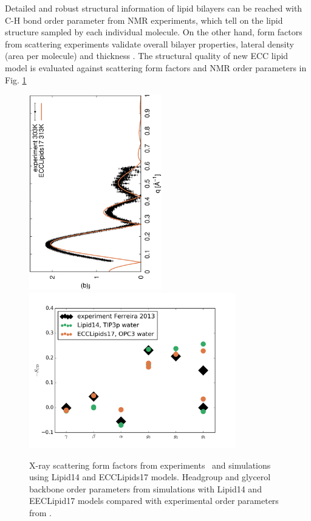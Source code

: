 \documentclass[aip,jcp,twocolumn]{revtex4}
\begin{document}
Detailed and robust structural information of lipid bilayers can
be reached with C-H bond order parameter from NMR experiments,
which tell on the lipid structure sampled by each individual molecule.
On the other hand, form factors from scattering experiments validate overall bilayer properties, 
lateral density (area per molecule) and thickness \cite{ollila16}. 
The structural quality of
new ECC lipid model is evaluated against scattering form factors and NMR order parameters
in Fig. \ref{simVSexpNOions}
\begin{figure}[]
  \centering
  \includegraphics[height=8.5cm,angle=-90]{../Fig/form-f_exp-l14-eccl17.eps}
%
  \includegraphics[width=9.0cm]{../Fig/ipython_nb/Headgr_OPs_exp-L14-ECCL17.png}
  \caption{\label{simVSexpNOions}
    X-ray scattering form factors from experiments~\cite{Kucerka2011} and simulations using Lipid14 and ECCLipids17 models. 
    Headgroup and glycerol backbone order parameters from simulations with Lipid14 \cite{dickson14} and EECLipid17 models
    compared with experimental order parameters from \cite{ferreira13}.}
\end{figure}
\end{document}
